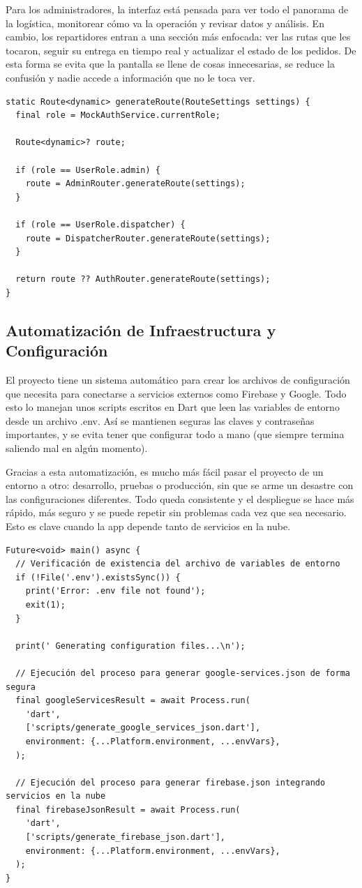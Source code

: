 Para los administradores, la interfaz está pensada para ver todo el panorama de la logística, monitorear cómo va la operación y revisar datos y análisis. En cambio, los repartidores entran a una sección más enfocada: ver las rutas que les tocaron, seguir su entrega en tiempo real y actualizar el estado de los pedidos. De esta forma se evita que la pantalla se llene de cosas innecesarias, se reduce la confusión y nadie accede a información que no le toca ver.
\begin{lstlisting}
static Route<dynamic> generateRoute(RouteSettings settings) {
  final role = MockAuthService.currentRole;

  Route<dynamic>? route;

  if (role == UserRole.admin) {
    route = AdminRouter.generateRoute(settings);
  }

  if (role == UserRole.dispatcher) {
    route = DispatcherRouter.generateRoute(settings);
  }

  return route ?? AuthRouter.generateRoute(settings);
}
\end{lstlisting}

\subsection{Automatización de Infraestructura y Configuración}
El proyecto tiene un sistema automático para crear los archivos de configuración que necesita para conectarse a servicios externos como Firebase y Google. Todo esto lo manejan unos scripts escritos en Dart que leen las variables de entorno desde un archivo .env. Así se mantienen seguras las claves y contraseñas importantes, y se evita tener que configurar todo a mano (que siempre termina saliendo mal en algún momento).

Gracias a esta automatización, es mucho más fácil pasar el proyecto de un entorno a otro: desarrollo, pruebas o producción, sin que se arme un desastre con las configuraciones diferentes. Todo queda consistente y el despliegue se hace más rápido, más seguro y se puede repetir sin problemas cada vez que sea necesario. Esto es clave cuando la app depende tanto de servicios en la nube.
\begin{lstlisting}
Future<void> main() async {
  // Verificación de existencia del archivo de variables de entorno
  if (!File('.env').existsSync()) {
    print('Error: .env file not found');
    exit(1);
  }

  print(' Generating configuration files...\n');

  // Ejecución del proceso para generar google-services.json de forma segura
  final googleServicesResult = await Process.run(
    'dart',
    ['scripts/generate_google_services_json.dart'],
    environment: {...Platform.environment, ...envVars},
  );

  // Ejecución del proceso para generar firebase.json integrando servicios en la nube
  final firebaseJsonResult = await Process.run(
    'dart',
    ['scripts/generate_firebase_json.dart'],
    environment: {...Platform.environment, ...envVars},
  );
}
\end{lstlisting}

